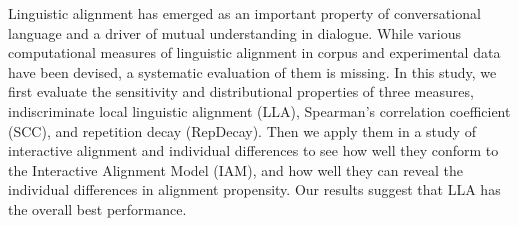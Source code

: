 Linguistic alignment has emerged as an important property of conversational language and a driver of mutual understanding in dialogue. While various computational measures of linguistic alignment in corpus and experimental data have been devised, a systematic evaluation of them is missing. In this study, we first evaluate the sensitivity and distributional properties of three measures, indiscriminate local linguistic alignment (LLA), Spearman's correlation coefficient (SCC), and repetition decay (RepDecay). Then we apply them in a study of interactive alignment and individual differences to see how well they conform to the Interactive Alignment Model (IAM), and how well they can reveal the individual differences in alignment propensity. Our results suggest that LLA has the overall best performance.
